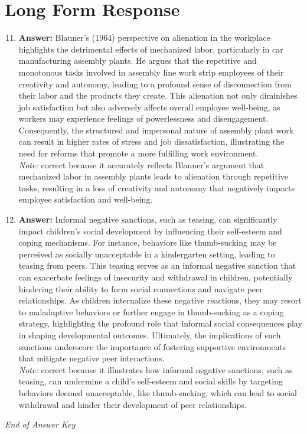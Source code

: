 \documentclass[12pt]{article}
\begin{document}
\section*{Long Form Response}
\begin{enumerate}[label=\arabic*.]
\setcounter{enumi}{10}
\item \textbf{Answer:} Blauner's (1964) perspective on alienation in the workplace highlights the detrimental effects of mechanized labor, particularly in car manufacturing assembly plants. He argues that the repetitive and monotonous tasks involved in assembly line work strip employees of their creativity and autonomy, leading to a profound sense of disconnection from their labor and the products they create. This alienation not only diminishes job satisfaction but also adversely affects overall employee well-being, as workers may experience feelings of powerlessness and disengagement. Consequently, the structured and impersonal nature of assembly plant work can result in higher rates of stress and job dissatisfaction, illustrating the need for reforms that promote a more fulfilling work environment.
\\ \textit{Note:} correct because it accurately reflects Blauner's argument that mechanized labor in assembly plants leads to alienation through repetitive tasks, resulting in a loss of creativity and autonomy that negatively impacts employee satisfaction and well-being.
\item \textbf{Answer:} Informal negative sanctions, such as teasing, can significantly impact children's social development by influencing their self-esteem and coping mechanisms. For instance, behaviors like thumb-sucking may be perceived as socially unacceptable in a kindergarten setting, leading to teasing from peers. This teasing serves as an informal negative sanction that can exacerbate feelings of insecurity and withdrawal in children, potentially hindering their ability to form social connections and navigate peer relationships. As children internalize these negative reactions, they may resort to maladaptive behaviors or further engage in thumb-sucking as a coping strategy, highlighting the profound role that informal social consequences play in shaping developmental outcomes. Ultimately, the implications of such sanctions underscore the importance of fostering supportive environments that mitigate negative peer interactions.
\\ \textit{Note:} correct because it illustrates how informal negative sanctions, such as teasing, can undermine a child's self-esteem and social skills by targeting behaviors deemed unacceptable, like thumb-sucking, which can lead to social withdrawal and hinder their development of peer relationships.
\end{enumerate}

\vfill
\noindent\textit{End of Answer Key}
\end{document}
